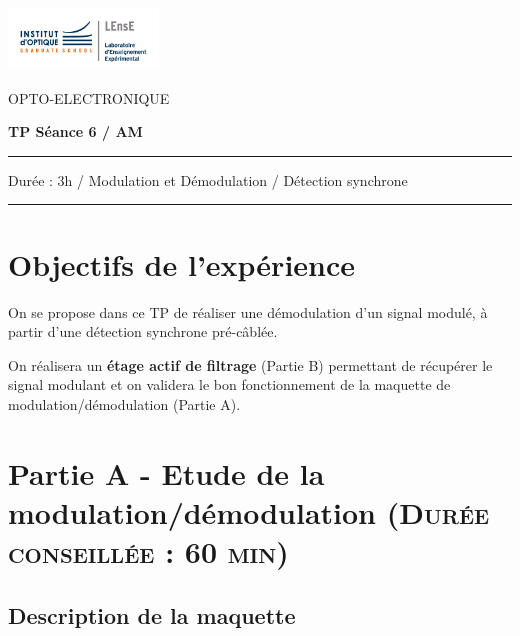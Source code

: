 \documentclass[a4paper,11pt]{article}
\begin{document}
\newpage
\begin{minipage}[c]{.25\linewidth}
	\includegraphics[width=4cm]{images/LEnsE_IOGS.jpg}
\end{minipage} \hfill
\begin{minipage}[c]{.4\linewidth}

\begin{center}
\vspace{0.3cm}
{\Large OPTO-ELECTRONIQUE}

\medskip

\textbf{\Large TP Séance 6 / AM}

\end{center}
\end{minipage}\hfill

\begin{center}
\vspace{0.3cm}

\noindent \rule{\linewidth}{1pt}

Durée : 3h / Modulation et Démodulation / Détection synchrone

\vspace{-0.2cm}
\noindent \rule{\linewidth}{1pt}
\end{center}


\section*{Objectifs de l'expérience}

On se propose dans ce TP de réaliser une démodulation d'un signal modulé, à partir d'une détection synchrone pré-câblée.

On réalisera un \textbf{étage actif de filtrage} (Partie B) permettant de récupérer le signal modulant et on validera le bon fonctionnement de la maquette de modulation/démodulation (Partie A).

	
\section*{Partie A - Etude de la modulation/démodulation \textsc{\normalsize(Durée conseillée : 60 min)}}
\subsection*{Description de la maquette}
\end{document}
